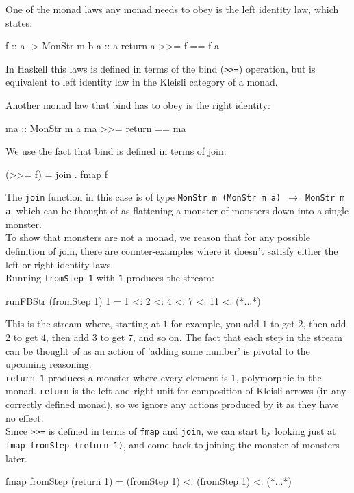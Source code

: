 One of the monad laws any monad needs to obey is the left identity law, which states: 
\begin{haskell}
f :: a -> MonStr m b
a :: a
return a  >>=  f == f a
\end{haskell}
In Haskell this laws is defined in terms of the bind (\verb+>>=+) operation, but is equivalent to left identity law in the Kleisli category of a monad.

Another monad law that bind has to obey is the right identity:
\begin{haskell}
ma :: MonStr m a
ma  >>= return == ma
\end{haskell}

We use the fact that bind is defined in terms of join:
\begin{haskell}
(>>= f) = join . fmap f 
\end{haskell}
The \verb+join+ function in this case is of type \texttt{MonStr m (MonStr m a) $\to$ MonStr m a}, which can be thought of as flattening a monster of monsters down into a single monster. \\

To show that monsters are not a monad, we reason that for any possible definition of join, there are counter-examples where it doesn't satisfy either the left or right identity laws.\\

Running \verb+fromStep 1+ with \verb+1+ produces the stream:
\begin{haskell}
runFBStr (fromStep 1) 1 = 1 <: 2 <: 4 <: 7 <: 11 <: (*...*)
\end{haskell}

This is the stream where, starting at $1$ for example, you add $1$ to get $2$, then add $2$ to get $4$, then add $3$ to get $7$, and so on. The fact that each step in the stream can be thought of as an action of 'adding some number' is pivotal to the upcoming reasoning.\\

\verb+return 1+ produces a monster where every element is $1$, polymorphic in the monad. \verb+return+ is the left and right unit for composition of Kleisli arrows (in any correctly defined monad), so we ignore any actions produced by it as they have no effect. \\

Since \verb+>>=+ is defined in terms of \verb+fmap+ and \verb+join+, we can start by looking just at \verb+fmap fromStep (return 1)+, and come back to joining the monster of monsters later.
\begin{haskell}
fmap fromStep (return 1) = (fromStep 1) <: (fromStep 1) <: (*...*)
\end{haskell}

